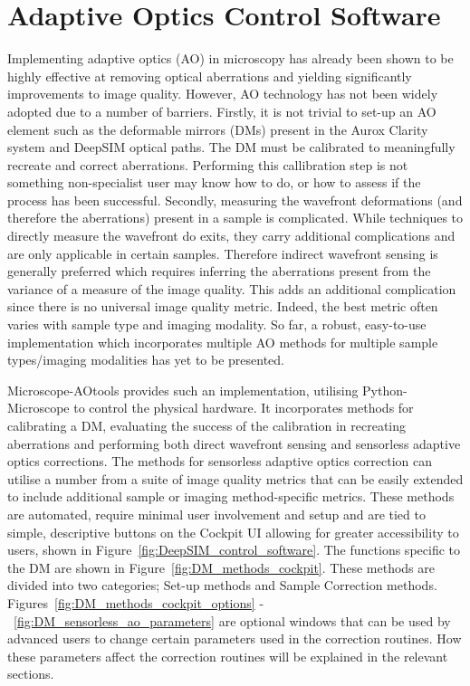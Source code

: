 \chapter{Adaptive Optics Control Software}
\label{chpt:ao_tools}

Implementing adaptive optics (AO) in microscopy has already been shown to be highly effective at removing optical aberrations and yielding significantly improvements to image quality.\cite{booth2014adaptive,girkin2009adaptive} However, AO technology has not been widely adopted due to a number of barriers. Firstly, it is not trivial to set-up an AO element such as the deformable mirrors (DMs) present in the Aurox Clarity system and DeepSIM optical paths. The DM must be calibrated to meaningfully recreate and correct aberrations. Performing this callibration step is not something non-specialist user may know how to do, or how to assess if the process has been successful. Secondly, measuring the wavefront deformations (and therefore the aberrations) present in a sample is complicated. While techniques to directly measure the  wavefront do exits, they carry additional complications and are only applicable in certain samples.\cite{wang2014rapid,wang2015direct} Therefore indirect wavefront sensing is generally preferred which requires inferring the aberrations present from the variance of a measure of the image quality.\cite{rodriguez2018adaptive} This adds an additional complication since there is no universal image quality metric. Indeed, the best metric often varies with sample type and imaging modality.\cite{burke2015adaptive,booth2002adaptive,fienup2003aberration,debarre2008adaptive} So far, a robust, easy-to-use implementation which incorporates multiple AO methods for multiple sample types/imaging modalities has yet to be presented.\cite{ji2017adaptive}

Microscope-AOtools provides such an implementation, utilising Python-Microscope to control the physical hardware. It incorporates methods for calibrating a DM, evaluating the success of the calibration in recreating aberrations and performing both direct wavefront sensing and sensorless adaptive optics corrections. The methods for sensorless adaptive optics correction can utilise a number from a suite of image quality metrics that can be easily extended to include additional sample or imaging method-specific metrics. These methods are automated, require minimal user involvement and setup and are tied to simple, descriptive  buttons on the Cockpit UI allowing for greater accessibility to users, shown in Figure~\ref{fig:DeepSIM_control_software}. The functions specific to the DM are shown in Figure~\ref{fig:DM_methods_cockpit}. These methods are divided into two categories; Set-up methods and Sample Correction methods. Figures~\ref{fig:DM_methods_cockpit_options} -~\ref{fig:DM_sensorless_ao_parameters} are optional windows that can be used by advanced users to change certain parameters used in the correction routines. How these parameters affect the correction routines will be explained in the relevant sections.

